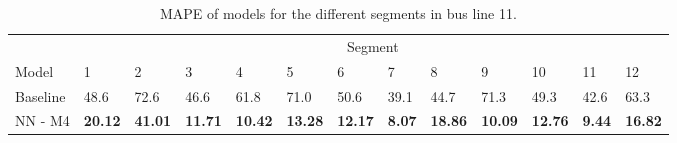 \begin{table}[H]
	\centering
	\caption{MAPE of models for the different segments in bus line 11.}
	\label{fig:model-mape-of-segs-211}
	\begin{adjustbox}{center}
	\begin{tabular}{ l | l | l | l | l | l | l | l | l | l | l | l | l}
		& \multicolumn{12}{c}{Segment} \\
		Model       & 1 & 2 & 3 & 4 & 5 & 6 & 7 & 8 & 9 & 10 & 11 & 12 \\
		\hline
		Baseline  & 48.6 & 72.6 & 46.6 & 61.8 & 71.0 & 50.6 & 39.1 & 44.7 & 71.3 & 49.3  & 42.6 & 63.3 \\
		NN - M4         & \textbf{20.12}& \textbf{41.01}& \textbf{11.71}& \textbf{10.42}& \textbf{13.28}& \textbf{12.17}& \textbf{8.07}& \textbf{18.86}& \textbf{10.09}& \textbf{12.76}& \textbf{9.44}& \textbf{16.82}\\
	\end{tabular}
	\end{adjustbox}
\end{table}





